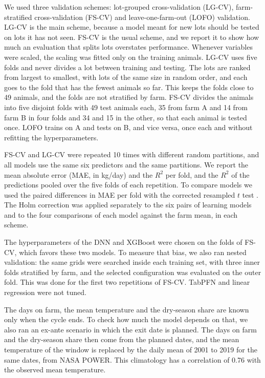 \documentclass[12pt]{article}
\begin{document}
We used three validation schemes: lot-grouped cross-validation (LG-CV), farm-stratified cross-validation (FS-CV) and leave-one-farm-out (LOFO) validation. LG-CV is the main scheme, because a model meant for new lots should be tested on lots it has not seen. FS-CV is the usual scheme, and we report it to show how much an evaluation that splits lots overstates performance. Whenever variables were scaled, the scaling was fitted only on the training animals. LG-CV uses five folds and never divides a lot between training and testing. The lots are ranked from largest to smallest, with lots of the same size in random order, and each goes to the fold that has the fewest animals so far. This keeps the folds close to 49 animals, and the folds are not stratified by farm. FS-CV divides the animals into five disjoint folds with 49 test animals each, 35 from farm A and 14 from farm B in four folds and 34 and 15 in the other, so that each animal is tested once. LOFO trains on A and tests on B, and vice versa, once each and without refitting the hyperparameters.

FS-CV and LG-CV were repeated 10 times with different random partitions, and all models use the same six predictors and the same partitions. We report the mean absolute error (MAE, in kg/day) and the $R^2$ per fold, and the $R^2$ of the predictions pooled over the five folds of each repetition. To compare models we used the paired differences in MAE per fold with the corrected resampled $t$ test \cite{nadeau2003}. The Holm correction \cite{holm1979} was applied separately to the six pairs of learning models and to the four comparisons of each model against the farm mean, in each scheme.

The hyperparameters of the DNN and XGBoost were chosen on the folds of FS-CV, which favors these two models. To measure that bias, we also ran nested validation: the same grids were searched inside each training set, with three inner folds stratified by farm, and the selected configuration was evaluated on the outer fold. This was done for the first two repetitions of FS-CV. TabPFN and linear regression were not tuned.

The days on farm, the mean temperature and the dry-season share are known only when the cycle ends. To check how much the model depends on that, we also ran an ex-ante scenario in which the exit date is planned. The days on farm and the dry-season share then come from the planned dates, and the mean temperature of the window is replaced by the daily mean of 2001 to 2019 for the same dates, from NASA POWER. This climatology has a correlation of 0.76 with the observed mean temperature.
\end{document}
